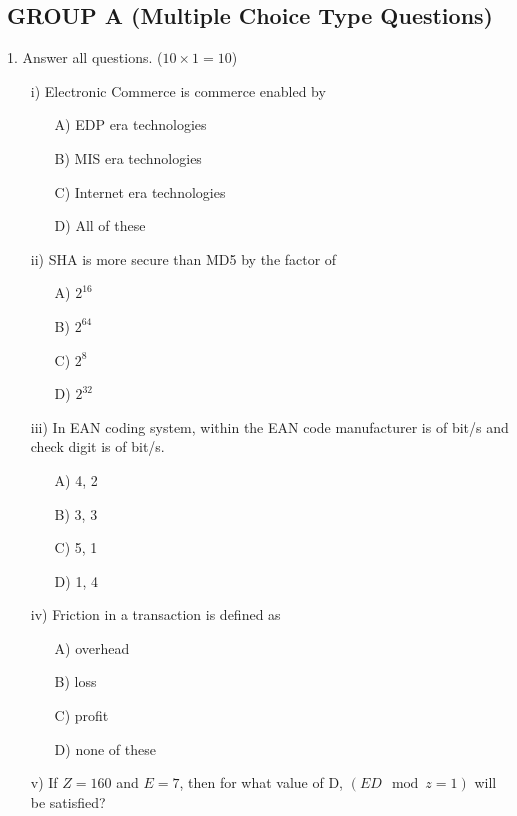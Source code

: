 \subsection*{GROUP A (Multiple Choice Type Questions)}
1. Answer all questions. ($10 \times 1 = 10$)
\begin{enumerate}
    \item[i)] Electronic Commerce is commerce enabled by
    \begin{enumerate}
        \item[A)] EDP era technologies
        \item[B)] MIS era technologies
        \item[C)] Internet era technologies
        \item[D)] All of these
    \end{enumerate}
    \item[ii)] SHA is more secure than MD5 by the factor of
    \begin{enumerate}
        \item[A)] $2^{16}$
        \item[B)] $2^{64}$
        \item[C)] $2^{8}$
        \item[D)] $2^{32}$
    \end{enumerate}
    \item[iii)] In EAN coding system, within the EAN code manufacturer is of \underline{\hspace{1cm}} bit/s and check digit is of \underline{\hspace{1cm}} bit/s.
    \begin{enumerate}
        \item[A)] 4, 2
        \item[B)] 3, 3
        \item[C)] 5, 1
        \item[D)] 1, 4
    \end{enumerate}
    \item[iv)] Friction in a transaction is defined as
    \begin{enumerate}
        \item[A)] overhead
        \item[B)] loss
        \item[C)] profit
        \item[D)] none of these
    \end{enumerate}
    \item[v)] If $Z=160$ and $E=7$, then for what value of D, $(ED \mod z = 1)$ will be satisfied?

\end{enumerate}
